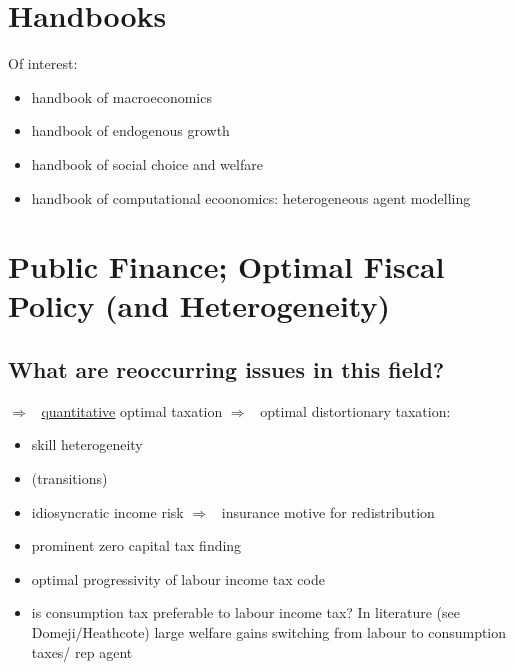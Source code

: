 \documentclass[12pt]{article}
\newcommand{\ar}{$\Rightarrow$ \ }
\begin{document}
\section{Handbooks}
Of interest:
\begin{itemize}
\item handbook of macroeconomics
\item handbook of endogenous growth
\item handbook of social choice and welfare
\item handbook of computational ecoonomics: heterogeneous agent modelling 
\end{itemize}
\section{Public Finance; Optimal Fiscal Policy (and Heterogeneity)}
\hypertarget{opt}{}
\localtableofcontents

\subsection{What are reoccurring issues in this field?}\ar \underline{quantitative} optimal taxation \ar optimal distortionary taxation:
\begin{itemize}
	\item skill heterogeneity 
	\item (transitions)
	\item idiosyncratic income risk \ar insurance motive for redistribution
	\item prominent zero capital tax finding
	\item optimal progressivity of labour income tax code
	\item is consumption tax preferable to labour income tax? In literature (see Domeji/Heathcote) large welfare gains switching from labour to consumption taxes/ rep agent
\end{itemize}


\subsection{ \citet*{Heathcote2017OptimalFramework}}
\end{document}
